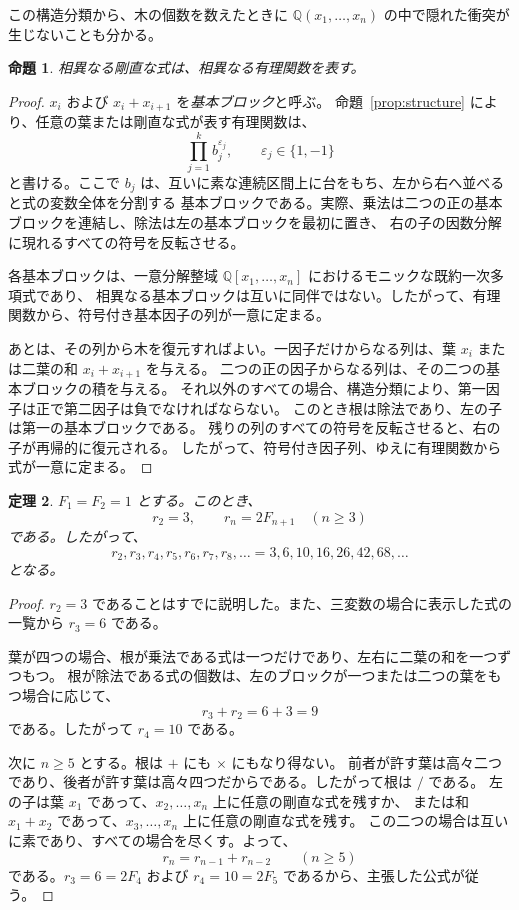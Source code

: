 \documentclass[11pt]{ltjsarticle}
\newtheorem{theorem}{定理}
\newtheorem{proposition}[theorem]{命題}
\newcommand{\Q}{\mathbb{Q}}
\begin{document}
この構造分類から、木の個数を数えたときに $\Q(x_1,\ldots,x_n)$ の中で隠れた衝突が生じないことも分かる。

\begin{proposition}\label{prop:distinct}
相異なる剛直な式は、相異なる有理関数を表す。
\end{proposition}

\begin{proof}
$x_i$ および $x_i+x_{i+1}$ を\emph{基本ブロック}と呼ぶ。
命題~\ref{prop:structure} により、任意の葉または剛直な式が表す有理関数は、
\[
 \prod_{j=1}^k b_j^{\varepsilon_j},
 \qquad \varepsilon_j\in\{1,-1\}
\]
と書ける。ここで $b_j$ は、互いに素な連続区間上に台をもち、左から右へ並べると式の変数全体を分割する
基本ブロックである。実際、乗法は二つの正の基本ブロックを連結し、除法は左の基本ブロックを最初に置き、
右の子の因数分解に現れるすべての符号を反転させる。

各基本ブロックは、一意分解整域 $\Q[x_1,\ldots,x_n]$ におけるモニックな既約一次多項式であり、
相異なる基本ブロックは互いに同伴ではない。したがって、有理関数から、符号付き基本因子の列が一意に定まる。

あとは、その列から木を復元すればよい。一因子だけからなる列は、葉 $x_i$ または二葉の和 $x_i+x_{i+1}$ を与える。
二つの正の因子からなる列は、その二つの基本ブロックの積を与える。
それ以外のすべての場合、構造分類により、第一因子は正で第二因子は負でなければならない。
このとき根は除法であり、左の子は第一の基本ブロックである。
残りの列のすべての符号を反転させると、右の子が再帰的に復元される。
したがって、符号付き因子列、ゆえに有理関数から式が一意に定まる。
\end{proof}

\begin{theorem}\label{thm:main}
$F_1=F_2=1$ とする。このとき、
\[
 r_2=3,
 \qquad
 r_n=2F_{n+1}\quad(n\ge3)
\]
である。したがって、
\[
 r_2,r_3,r_4,r_5,r_6,r_7,r_8,\ldots
   =3,6,10,16,26,42,68,\ldots
\]
となる。
\end{theorem}

\begin{proof}
$r_2=3$ であることはすでに説明した。また、三変数の場合に表示した式の一覧から $r_3=6$ である。

葉が四つの場合、根が乗法である式は一つだけであり、左右に二葉の和を一つずつもつ。
根が除法である式の個数は、左のブロックが一つまたは二つの葉をもつ場合に応じて、
\[
 r_3+r_2=6+3=9
\]
である。したがって $r_4=10$ である。

次に $n\ge5$ とする。根は $+$ にも $\times$ にもなり得ない。
前者が許す葉は高々二つであり、後者が許す葉は高々四つだからである。したがって根は $/$ である。
左の子は葉 $x_1$ であって、$x_2,\ldots,x_n$ 上に任意の剛直な式を残すか、
または和 $x_1+x_2$ であって、$x_3,\ldots,x_n$ 上に任意の剛直な式を残す。
この二つの場合は互いに素であり、すべての場合を尽くす。よって、
\[
 r_n=r_{n-1}+r_{n-2}\qquad(n\ge5)
\]
である。$r_3=6=2F_4$ および $r_4=10=2F_5$ であるから、主張した公式が従う。
\end{proof}
\end{document}
